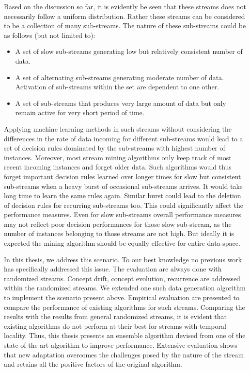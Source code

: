 \documentclass[a4paper, 11pt, oneside]{book}
\begin{document}
Based on the discussion so far, it is evidently be seen that these streams does not necessarily follow a uniform distribution. Rather these streams can be considered to be a collection of many sub-streams. The nature of these sub-streams could be as follows (but not limited to):
\begin{itemize}
    \item A set of slow sub-streams generating low but relatively consistent number of data.
    \item A set of alternating sub-streams generating moderate number of data. Activation of sub-streams within the set are dependent to one other.
    \item A set of sub-streams that produces very large amount of data but only remain active for very short period of time.
\end{itemize}

Applying machine learning methods in such streams without considering the differences in the rate of data incoming for different sub-streams would lead to a set of decision rules dominated by the sub-streams with highest number of instances. Moreover, most stream mining algorithms only keep track of most recent incoming instances and forget older data. Such algorithms would thus forget important decision rules learned over longer times for slow but consistent sub-streams when a heavy burst of occasional sub-streams arrives. It would take long time to learn the same rules again. Similar burst could lead to the deletion of decision rules for recurring sub-streams too. This could significantly affect the performance measures. Even for slow sub-streams overall performance measures may not reflect poor decision performances for those slow sub-stream, as the number of instances belonging to those streams are not high. But ideally it is expected the mining algorithm should be equally effective for entire data space.

In this thesis, we address this scenario. To our best knowledge no previous work has specifically addressed this issue. The evaluation are always done with randomized streams. Concept drift, concept evolution, recurrence are addressed within the randomized streams. We extended one such data generation algorithm to implement the scenario present above. Empirical evaluation are presented to compare the performance of existing algorithms for such streams. Comparing the results with the results from general randomized streams, it is evident that existing algorithms do not perform at their best for streams with temporal locality. Thus, this thesis presents an ensemble algorithm devised from one of the state-of-the-art algorithm to improve performance. Extensive evaluation shows that new adaptation overcomes the challenges posed by the nature of the stream and retains all the positive factors of the original algorithm.
\end{document}
